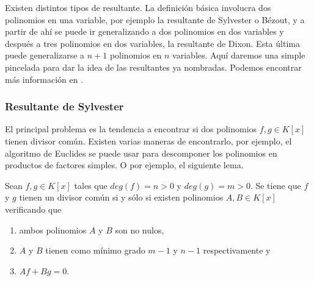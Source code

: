 Existen distintos tipos de resultante. La definición básica involucra dos polinomios en una variable, por ejemplo la resultante de Sylvester o Bézout, y a partir de ahí se puede ir generalizando a dos polinomios en dos variables y después a tres polinomios en dos variables, la resultante de Dixon. Esta última puede generalizarse a $n+1$ polinomios en $n$ variables. Aquí daremos una simple pincelada para dar la idea de las resultantes ya nombradas. Podemos encontrar más información en \cite{Berchtold00}.

\subsubsection*{Resultante de Sylvester}

El principal problema es la tendencia a encontrar si dos polinomios $f, g \in K[x]$ tienen divisor común. Existen varias maneras de encontrarlo, por ejemplo, el algoritmo de Euclides se puede usar para descomponer los polinomios en productos de factores simples. O por ejemplo, el siguiente lema.

\begin{lemma}
	Sean $f,g \in K[x]$ tales que $deg(f) = n > 0$ y $deg(g) = m > 0$. Se tiene que $f$ y $g$ tienen un divisor común si y sólo si existen polinomios $A, B \in K[x]$ verificando que
	\begin{enumerate}
		\item ambos polinomios $A$ y $B$ son no nulos,
		\item $A$ y $B$ tienen como mínimo grado $m-1$ y $n-1$ respectivamente y
		\item $Af + Bg = 0$.
	\end{enumerate}
\end{lemma}

